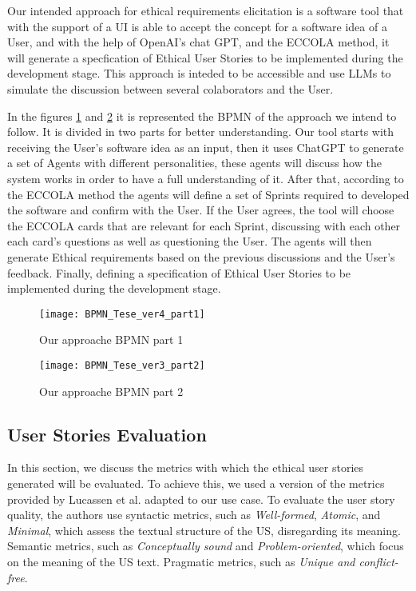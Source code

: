 Our intended approach for ethical requirements elicitation is a software tool that with the support of a UI is able to accept the concept for a software idea of a User, and with the help of OpenAI's chat GPT, and
the ECCOLA method, it will generate a specfication of Ethical User Stories to be implemented during the development stage. This approach is inteded to be accessible and use LLMs to simulate the discussion
between several colaborators and the User.

In the figures \ref{fig:BPMN_Tese_ver4_part1} and \ref{fig:BPMN_Tese_ver3_part2} it is represented the BPMN of the approach we intend to follow. 
It is divided in two parts for better understanding. Our tool starts with receiving the User's software idea as an input, then it uses ChatGPT to generate a set of Agents with different personalities,
these agents will discuss how the system works in order to have a full understanding of it. After that, according to the ECCOLA method \cite{VAKKURI2021111067} the agents will define a set of Sprints
required to developed the software and confirm with the User. If the User agrees, the tool will choose the ECCOLA cards that are relevant for each Sprint, discussing with each other each card's questions
as well as questioning the User. The agents will then generate Ethical requirements based on the previous discussions and the User's feedback. Finally, defining a specification of Ethical User Stories to be
implemented during the development stage.

\begin{figure}[h]
    \centering
    \texttt{[image: BPMN\_Tese\_ver4\_part1]}
    \caption{Our approache BPMN part 1}
    \label{fig:BPMN_Tese_ver4_part1}
  \end{figure}

\begin{figure}[h]
    \centering
    \texttt{[image: BPMN\_Tese\_ver3\_part2]}
    \caption{Our approache BPMN part 2}
    \label{fig:BPMN_Tese_ver3_part2}
  \end{figure}

\subsection{User Stories Evaluation}
In this section, we discuss the metrics with which the ethical user stories generated
will be evaluated. To achieve this, we used a version of the metrics provided by Lucassen et al. \cite{b22} adapted to our use case.
To evaluate the user story quality, the authors use syntactic metrics, such as \textit{Well-formed}, \textit{Atomic}, and \textit{Minimal}, which assess the textual structure of the US, disregarding its meaning. Semantic metrics, such as \textit{Conceptually sound} and \textit{Problem-oriented}, which focus on the meaning of the US text. Pragmatic metrics, such as \textit{Unique and conflict-free}.

